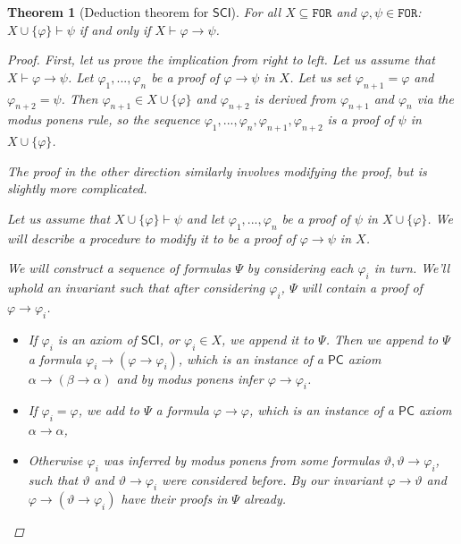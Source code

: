 \documentclass{article}
\newtheorem{theorem}{Theorem}
\theoremstyle{definition}
\theoremstyle{definition}
\theoremstyle{definition}
\newcommand*{\ra}{\rightarrow}
\newcommand*{\FOR}{\texttt{FOR}}
\newcommand{\SCI}{$\mathsf{SCI}$\xspace}
\newcommand{\PC}{$\mathsf{PC}$\xspace}
\begin{document}
\begin{theorem}[Deduction theorem for \SCI]
    For all $X \subseteq \FOR$ and $\varphi, \psi \in \FOR$: $X \cup \{\varphi\} \vdash \psi$ if and only if $X \vdash \varphi \ra \psi$.
    \begin{proof}
        First, let us prove the implication from right to left. Let us assume that $X \vdash \varphi \ra \psi$. Let $\varphi_1, ..., \varphi_n$ be a proof of $\varphi \ra \psi$ in $X$. Let us set $\varphi_{n+1} = \varphi$ and $\varphi_{n+2} = \psi$. Then $\varphi_{n+1} \in X \cup \{\varphi\}$ and $\varphi_{n+2}$ is derived from $\varphi_{n+1}$ and $\varphi_{n}$ via the \emph{modus ponens} rule, so the sequence $\varphi_1, ..., \varphi_n, \varphi_{n+1}, \varphi_{n+2}$ is a proof of $\psi$ in $X \cup \{\varphi\}$.

        The proof in the other direction similarly involves modifying the proof, but is
        slightly more complicated.

        Let us assume that $X \cup \{\varphi\} \vdash \psi$ and let $\varphi_1, ...,
            \varphi_n$ be a proof of $\psi$ in $X \cup \{\varphi\}$. We will describe a
        procedure to modify it to be a proof of $\varphi \ra \psi$ in $X$.

        We will construct a sequence of formulas $\Psi$ by considering each $\varphi_i$
        in turn. We'll uphold an invariant such that after considering $\varphi_i$,
        $\Psi$ will contain a proof of $\varphi \ra \varphi_i$.

        \begin{itemize}
            \item If $\varphi_i$ is an axiom of \SCI, or $\varphi_i \in X$, we append it to
                  $\Psi$. Then we append to $\Psi$ a formula $\varphi_i \ra (\varphi \ra
                      \varphi_i)$, which is an instance of a \PC axiom $\alpha \ra (\beta \ra
                      \alpha)$ and by \emph{modus ponens} infer $\varphi \ra \varphi_i$.
            \item If $\varphi_i = \varphi$, we add to $\Psi$ a formula $\varphi \ra \varphi$,
                  which is an instance of a \PC axiom $\alpha \ra \alpha$,
            \item Otherwise $\varphi_i$ was inferred by \emph{modus ponens} from some formulas
                  $\vartheta, \vartheta \ra \varphi_i$, such that $\vartheta$ and $\vartheta \ra
                      \varphi_i$ were considered before. By our invariant $\varphi \ra \vartheta$ and
                  $\varphi \ra (\vartheta \ra \varphi_i)$ have their proofs in $\Psi$ already.


\end{itemize}
\end{proof}
\end{theorem}
\end{document}
